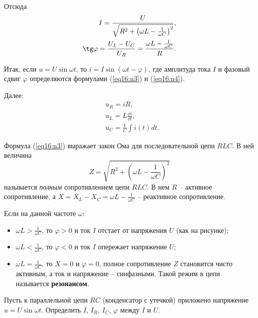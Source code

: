 \begin{solution}
        Отсюда
        \begin{align}
            I = \frac{U}{\sqrt{R^2 + \left(\omega L - 
            \frac{1}{\omega C}\right)^2}},
            \label{eq16:n3} \\
            \tg\varphi = \frac{U_L - U_C}{U_R} =
            \frac{\omega L - \frac{1}{\omega C}}{R}.
            \label{eq16:n4}
        \end{align}
        
        Итак, если \( u = U\sin\omega t \), то
        \( i = I\sin(\omega t - \varphi) \), где амплитуда тока \( I \) и
        фазовый сдвиг \( \varphi \) определяются формулами (\ref{eq16:n3}) и
        (\ref{eq16:n4}).
        
        Далее:
        \begin{align*}
            & u_R = iR, \\
            & u_L = L\frac{\dd i}{\dd t}, \\
            & u_C = \frac{1}{C} \int i(t)dt.
        \end{align*}
    \end{solution}
	
	Формула (\ref{eq16:n3}) выражает закон Ома для последовательной цепи
    \( RLC \). В ней величина
    \[
        Z = \sqrt{R^2 + \left(\omega L - \frac{1}{\omega C}\right)^2}
    \]
     называется \textit{полным} сопротивлением цепи \( RLC \). В нем \( R \)
     -- активное сопротивление, а
     \( X = X_L - X_C = \omega L - \frac{1}{\omega C} \) --
     реактивное сопротивление.
	
	Если на данной частоте \( \omega \):
	\begin{itemize}
        \item \( \omega L > \frac{1}{\omega C} \), то \( \varphi > 0 \) и ток
            \( I \) отстает от напряжения \( U \) (как на рисунке);
        \item \( \omega L < \frac{1}{\omega C} \), то \( \varphi < 0 \) и ток
            \( I \) опережает напряжение \( U \);
        \item \( \omega L = \frac{1}{\omega C} \), то \( X = 0 \) и
            \( \varphi = 0 \), полное сопротивление \( Z \) становится чисто
            активным, а ток и напряжение -- синфазными. Такой режим в цепи
            называется \textbf{резонансом}.
	\end{itemize}
	
	\begin{example}
        Пусть к параллельной цепи \( RC \) (конденсатор с утечкой) приложено
        напряжение \( u = U\sin\omega t \). Определить \( I \), \( I_R \),
        \( I_C \), \( \varphi \) между \( I \) и \( U \).
	\end{example}
	
